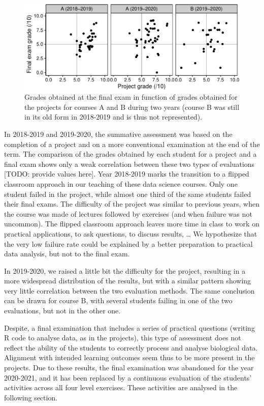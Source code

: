\documentclass[
]{article}
\begin{document}
\begin{figure}
\centering
\includegraphics{teaching_data_science_files/figure-latex/fig_exams_projects-1.pdf}
\caption{Grades obtained at the final exam in function of grades
obtained for the projects for courses A and B during two years (course B
was still in its old form in 2018-2019 and is thus not represented).}
\end{figure}

In 2018-2019 and 2019-2020, the summative assessment was based on the
completion of a project and on a more conventional examination at the
end of the term. The comparison of the grades obtained by each student
for a project and a final exam shows only a weak correlation between
these two types of evaluations {[}TODO: provide values here{]}. Year
2018-2019 marks the transition to a flipped classroom approach in our
teaching of these data science courses. Only one student failed in the
project, while almost one third of the same students failed their final
exams. The difficulty of the project was similar to previous years, when
the course was made of lectures followed by exercises (and when failure
was not uncommon). The flipped classroom approach leaves more time in
class to work on practical applications, to ask questions, to discuss
results, \ldots{} We hypothesize that the very low failure rate could be
explained by a better preparation to practical data analysis, but not to
the final exam.

In 2019-2020, we raised a little bit the difficulty for the project,
resulting in a more widespread distribution of the results, but with a
similar pattern showing very little correlation between the two
evaluation methods. The same conclusion can be drawn for course B, with
several students failing in one of the two evaluations, but not in the
other one.

Despite, a final examination that includes a series of practical
questions (writing R code to analyse data, as in the projects), this
type of assessment does not reflect the ability of the students to
correctly process and analyse biological data. Alignment with intended
learning outcomes seem thus to be more present in the projects. Due to
these results, the final examination was abandoned for the year
2020-2021, and it has been replaced by a continuous evaluation of the
students' activities across all four level exercises. These activities
are analysed in the following section.
\end{document}
